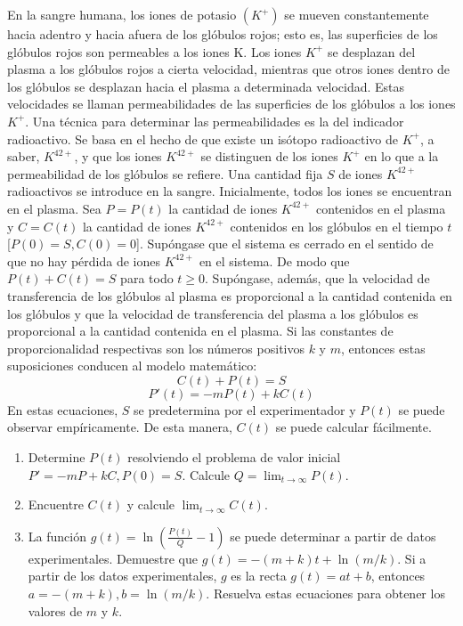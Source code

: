 \item En la sangre humana, los iones de potasio $(K^+)$ se mueven constantemente hacia adentro y hacia afuera de los glóbulos rojos; esto es, las superficies de los glóbulos rojos son permeables a los iones K. Los iones $K^+$ se desplazan del plasma a los glóbulos rojos a cierta velocidad, mientras que otros iones dentro de los glóbulos se desplazan hacia el plasma a determinada velocidad. Estas velocidades se llaman permeabilidades de las superficies de los glóbulos a los iones $K^+$. Una técnica para determinar las permeabilidades es la del indicador radioactivo. Se basa en el hecho de que existe un isótopo radioactivo de $K^+$, a saber, $K^{42+}$, y que los iones $K^{42+}$ se distinguen de los iones $K^+$ en lo que a la permeabilidad de los glóbulos se refiere. Una cantidad fija $S$ de iones $K^{42+}$ radioactivos se introduce en la sangre. Inicialmente, todos los iones se encuentran en el plasma. Sea $P = P(t)$ la cantidad de iones $K^{42+}$ contenidos en el plasma y $C = C(t)$ la cantidad de iones $K^{42+}$ contenidos en los glóbulos en el tiempo $t$ [$P(0) = S, C(0) = 0$]. Supóngase que el sistema es cerrado en el sentido de que no hay pérdida de iones $K^{42+}$ en el sistema. De modo que $P(t) + C(t) = S$ para todo $t \ge 0$. Supóngase, además, que la velocidad de transferencia de los glóbulos al plasma es proporcional a la cantidad contenida en los glóbulos y que la velocidad de transferencia del plasma a los glóbulos es proporcional a la cantidad contenida en el plasma. Si las constantes de proporcionalidad respectivas son los números positivos $k$ y $m$, entonces estas suposiciones conducen al modelo matemático:
    \[ C(t) + P(t) = S \]
    \[ P'(t) = -mP(t) + kC(t) \]
    En estas ecuaciones, $S$ se predetermina por el experimentador y $P(t)$ se puede observar empíricamente. De esta manera, $C(t)$ se puede calcular fácilmente.
    \begin{enumerate}
        \item[(a)] Determine $P(t)$ resolviendo el problema de valor inicial $P' = -mP + kC, P(0) = S$. Calcule $Q = \lim_{t \to \infty} P(t)$.
        \item[(b)] Encuentre $C(t)$ y calcule $\lim_{t \to \infty} C(t)$.
        \item[(c)] La función $g(t) = \ln\left(\frac{P(t)}{Q} - 1\right)$ se puede determinar a partir de datos experimentales. Demuestre que $g(t) = -(m + k)t + \ln(m/k)$. Si a partir de los datos experimentales, $g$ es la recta $g(t) = at + b$, entonces $a = -(m+k), b = \ln(m/k)$. Resuelva estas ecuaciones para obtener los valores de $m$ y $k$.
    \end{enumerate}
